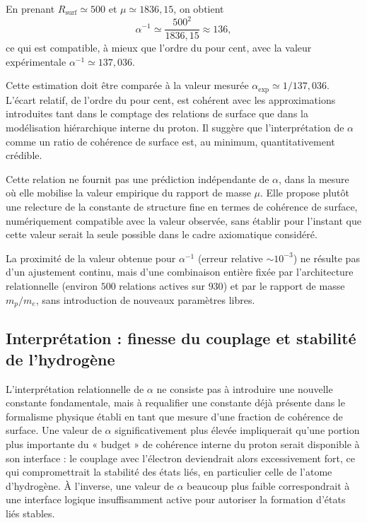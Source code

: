 \documentclass[11pt,a4paper]{article}
\begin{document}
En prenant \(R_{\mathrm{surf}} \simeq 500\) et \(\mu \simeq 1836{,}15\), on obtient
\[
\alpha^{-1} \simeq \frac{500^{2}}{1836{,}15} \approx 136,
\]
ce qui est compatible, à mieux que l’ordre du pour cent, avec la valeur expérimentale \(\alpha^{-1} \simeq 137{,}036\).

Cette estimation doit être comparée à la valeur mesurée \(\alpha_{\mathrm{exp}} \simeq 1/137{,}036\). L’écart relatif, de l’ordre du pour cent, est cohérent avec les approximations introduites tant dans le comptage des relations de surface que dans la modélisation hiérarchique interne du proton. Il suggère que l’interprétation de \(\alpha\) comme un ratio de cohérence de surface est, au minimum, quantitativement crédible.

Cette relation ne fournit pas une prédiction indépendante de \(\alpha\), dans la mesure où elle mobilise la valeur empirique du rapport de masse \(\mu\). Elle propose plutôt une relecture de la constante de structure fine en termes de cohérence de surface, numériquement compatible avec la valeur observée, sans établir pour l’instant que cette valeur serait la seule possible dans le cadre axiomatique considéré.

La proximité de la valeur obtenue pour \(\alpha^{-1}\) (erreur relative \(\sim 10^{-3}\)) ne résulte pas d’un ajustement continu, mais d’une combinaison entière fixée par l’architecture relationnelle (environ \(500\) relations actives sur \(930\)) et par le rapport de masse \(m_p/m_e\), sans introduction de nouveaux paramètres libres.

\subsection{Interprétation : finesse du couplage et stabilité de l’hydrogène}

L’interprétation relationnelle de \(\alpha\) ne consiste pas à introduire une nouvelle constante fondamentale, mais à requalifier une constante déjà présente dans le formalisme physique établi en tant que mesure d’une fraction de cohérence de surface. Une valeur de \(\alpha\) significativement plus élevée impliquerait qu’une portion plus importante du « budget » de cohérence interne du proton serait disponible à son interface : le couplage avec l’électron deviendrait alors excessivement fort, ce qui compromettrait la stabilité des états liés, en particulier celle de l’atome d’hydrogène. À l’inverse, une valeur de \(\alpha\) beaucoup plus faible correspondrait à une interface logique insuffisamment active pour autoriser la formation d’états liés stables.
\end{document}
